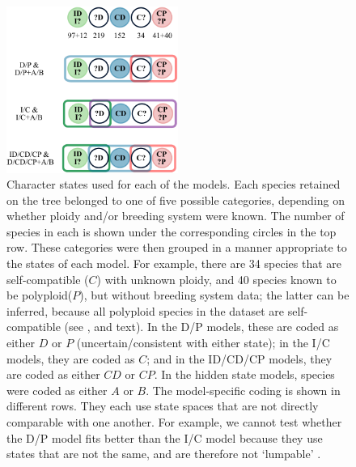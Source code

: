 \begin{figure}
\centering
\includegraphics[width=0.5\textwidth]{states.pdf}
\caption{
Character states used for each of the models.
Each species retained on the tree belonged to one of five possible categories, depending on whether ploidy and/or breeding system were known.
The number of species in each is shown under the corresponding circles in the top row.
These categories were then grouped in a manner appropriate to the states of each model.
For example, there are 34 species that are self-compatible ($C$) with unknown ploidy, and 40 species known to be polyploid($P$), but without breeding system data; the latter can be inferred, because all polyploid species in the dataset are self-compatible (see \citealt{robertson_2011}, and text). %
In the D/P models, these are coded as either $D$ or $P$ (uncertain/consistent with either state); in the I/C  models, they are coded as $C$; and in the ID/CD/CP models, they are coded as either $CD$ or $CP$.
In the hidden state models, species were coded as either $A$ or $B$.
The model-specific coding is shown in different rows. 
They each use state spaces that are not directly comparable with one another.
For example, we cannot test whether the D/P model fits better than the I/C model because they use states that are not the same, and are therefore not `lumpable' \citep{tarasov_2019}.
}
\label{figure:stateclassifications}
\end{figure}

